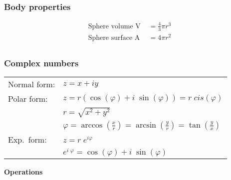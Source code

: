 \subsubsection{Body properties}
\begin{align*}
    \text{Sphere volume V }  & = \frac{4}{3}\pi r^3 \\
    \text{Sphere surface A } & = 4\pi r^2           \\
\end{align*}

\subsubsection{Complex numbers}

\renewcommand{\arraystretch}{1.4}

\begin{tabular}{ m{2.4cm}  m{6cm} }
    Normal form: & $z=x+iy$                                                                                               \\
    Polar form:  & $z=r(\cos(\varphi)+ i\; \sin(\varphi))=r\;cis(\varphi)$                                                \\
                 & $r=\sqrt{x^2+y^2}$                                                                                     \\
                 & $\varphi=\arccos\left(\frac{x}{r}\right)=\arcsin\left(\frac{y}{r}\right)=\tan\left(\frac{y}{x}\right)$ \\
    Exp.\ form:  & $z=r\; e^{i\varphi}$                                                                                   \\
                 & $e^{i\; \varphi}=\cos(\varphi)+i\; \sin(\varphi)$

    
    
    
    
    
    
    
    
    
    
    
    
\end{tabular}

\textbf{Operations}

